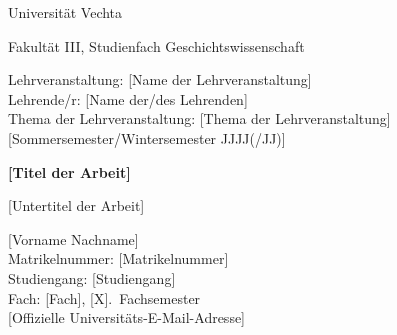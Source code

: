 
\newcommand{\coverInstitution}{Universität Vechta}
\newcommand{\coverFaculty}{Fakultät III}
\newcommand{\coverSubject}{Studienfach Geschichtswissenschaft}
\newcommand{\coverCourse}{[Name der Lehrveranstaltung]}
\newcommand{\coverLecturer}{[Name der/des Lehrenden]}
\newcommand{\coverCourseTopic}{[Thema der Lehrveranstaltung]}
\newcommand{\coverSemester}{[Sommersemester/Wintersemester JJJJ(/JJ)]}
\newcommand{\coverTitle}{[Titel der Arbeit]}
\newcommand{\coverSubtitle}{[Untertitel der Arbeit]}
\newcommand{\coverAuthor}{[Vorname Nachname]}
\newcommand{\coverMatriculation}{[Matrikelnummer]}
\newcommand{\coverDegree}{[Studiengang]}
\newcommand{\coverMajor}{[Fach]}
\newcommand{\coverTermNumber}{[X]}
\newcommand{\coverEmail}{[Offizielle Universitäts-E-Mail-Adresse]}

\begin{titlepage}
  \centering

  {\large \coverInstitution\par}
  {\large \coverFaculty, \coverSubject\par}

  \vspace{1.5cm}

  {\normalsize
    Lehrveranstaltung: \coverCourse\\[0.3em]
    Lehrende/r: \coverLecturer\\[0.3em]
    Thema der Lehrveranstaltung: \coverCourseTopic\\[0.3em]
    \coverSemester
  \par}

  \vspace{2.5cm}

  {\LARGE\bfseries \coverTitle\par}
  \vspace{0.4cm}
  {\large \coverSubtitle\par}

  \vfill

  {\normalsize
    \coverAuthor\\[0.3em]
    Matrikelnummer: \coverMatriculation\\[0.3em]
    Studiengang: \coverDegree\\[0.3em]
    Fach: \coverMajor, \coverTermNumber.\ Fachsemester\\[0.3em]
    \coverEmail
  \par}

\end{titlepage}
